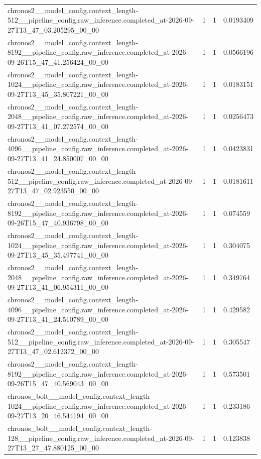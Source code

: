 \begin{tabular}{llll}
chronos2\_\_model\_config.context\_length-512\_\_pipeline\_config.raw\_inference.completed\_at-2026-09-27T13\_47\_03.205295\_00\_00 & 1 & 1 & 0.0193409 \\
chronos2\_\_model\_config.context\_length-8192\_\_pipeline\_config.raw\_inference.completed\_at-2026-09-26T15\_47\_41.256424\_00\_00 & 1 & 1 & 0.0566196 \\
chronos2\_\_model\_config.context\_length-1024\_\_pipeline\_config.raw\_inference.completed\_at-2026-09-27T13\_45\_35.807221\_00\_00 & 1 & 1 & 0.0183151 \\
chronos2\_\_model\_config.context\_length-2048\_\_pipeline\_config.raw\_inference.completed\_at-2026-09-27T13\_41\_07.272574\_00\_00 & 1 & 1 & 0.0256473 \\
chronos2\_\_model\_config.context\_length-4096\_\_pipeline\_config.raw\_inference.completed\_at-2026-09-27T13\_41\_24.850007\_00\_00 & 1 & 1 & 0.0423831 \\
chronos2\_\_model\_config.context\_length-512\_\_pipeline\_config.raw\_inference.completed\_at-2026-09-27T13\_47\_02.923550\_00\_00 & 1 & 1 & 0.0181611 \\
chronos2\_\_model\_config.context\_length-8192\_\_pipeline\_config.raw\_inference.completed\_at-2026-09-26T15\_47\_40.936798\_00\_00 & 1 & 1 & 0.074559 \\
chronos2\_\_model\_config.context\_length-1024\_\_pipeline\_config.raw\_inference.completed\_at-2026-09-27T13\_45\_35.497741\_00\_00 & 1 & 1 & 0.304075 \\
chronos2\_\_model\_config.context\_length-2048\_\_pipeline\_config.raw\_inference.completed\_at-2026-09-27T13\_41\_06.954311\_00\_00 & 1 & 1 & 0.349764 \\
chronos2\_\_model\_config.context\_length-4096\_\_pipeline\_config.raw\_inference.completed\_at-2026-09-27T13\_41\_24.510789\_00\_00 & 1 & 1 & 0.429582 \\
chronos2\_\_model\_config.context\_length-512\_\_pipeline\_config.raw\_inference.completed\_at-2026-09-27T13\_47\_02.612372\_00\_00 & 1 & 1 & 0.305547 \\
chronos2\_\_model\_config.context\_length-8192\_\_pipeline\_config.raw\_inference.completed\_at-2026-09-26T15\_47\_40.569043\_00\_00 & 1 & 1 & 0.573501 \\
chronos\_bolt\_\_model\_config.context\_length-1024\_\_pipeline\_config.raw\_inference.completed\_at-2026-09-27T13\_20\_46.544194\_00\_00 & 1 & 1 & 0.233186 \\
chronos\_bolt\_\_model\_config.context\_length-128\_\_pipeline\_config.raw\_inference.completed\_at-2026-09-27T13\_27\_47.880125\_00\_00 & 1 & 1 & 0.123838 \\

\end{tabular}
